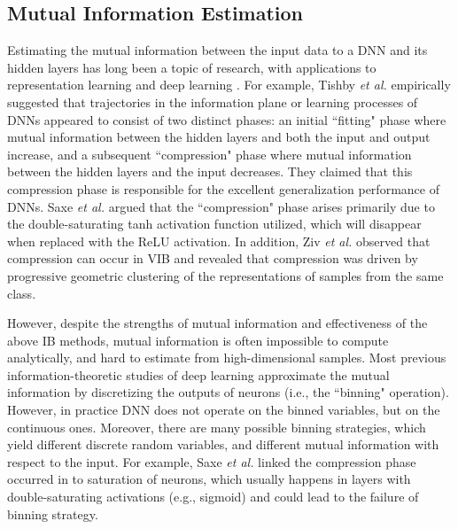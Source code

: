 \documentclass[10pt,journal,compsoc]{IEEEtran}
\begin{document}
\subsection{Mutual Information Estimation}
Estimating the mutual information between the input data to a DNN and its hidden layers has long been a topic of research, with applications to representation learning \cite{Oord2018RepresentationLW} and deep learning \cite{ShwartzZiv2017OpeningTB,Saxe2018OnTI,pmlr-v97-goldfeld19a,Wu2019LearnabilityFT}. For example, Tishby \emph{et al.} \cite{ShwartzZiv2017OpeningTB} empirically suggested that trajectories in the information plane or learning processes of DNNs appeared to consist of two distinct phases: an initial ``fitting" phase where mutual information between the hidden layers and both the input and output increase, and a subsequent ``compression" phase where mutual information between the hidden layers and the input decreases. They claimed that this compression phase is responsible for the excellent generalization performance of DNNs. Saxe \emph{et al.} \cite{Saxe2018OnTI} argued that the ``compression" phase arises primarily due to the double-saturating tanh activation function utilized, which will disappear when replaced with the ReLU activation. In addition, Ziv \emph{et al.} \cite{pmlr-v97-goldfeld19a} observed that compression can occur in VIB and revealed that compression was driven by progressive geometric clustering of the representations of samples from the same class.


However, despite the strengths of mutual information and effectiveness of the above IB methods, mutual information is often impossible to compute analytically, and hard to estimate from high-dimensional samples. Most previous information-theoretic studies of deep learning \cite{ShwartzZiv2017OpeningTB, Saxe2018OnTI} approximate the mutual information by discretizing the outputs of neurons (i.e., the ``binning" operation). However, in practice DNN does not operate on the binned variables, but on the continuous ones. Moreover, there are many possible binning strategies, which yield different discrete random variables, and different mutual information with respect to the input. For example, Saxe \emph{et al.} \cite{Saxe2018OnTI} linked the compression phase occurred in \cite{ShwartzZiv2017OpeningTB} to saturation of neurons, which usually happens in layers with double-saturating activations (e.g., sigmoid) and could lead to the failure of binning strategy.
\end{document}
